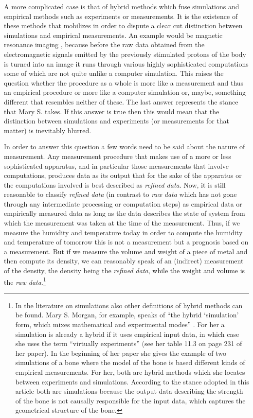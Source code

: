 \documentclass[onecollarge]{STJour}
\numberwithin{equation}{section}
\begin{document}
A more complicated case is that of hybrid methods which fuse simulations and empirical methods such as experiments or measurements. It is the existence of these methods that \citet{morrison:2009} mobilizes in order to dispute a clear cut distinction between simulations and empirical measurements.
An example would be magnetic resonance imaging \citep{lee-carroll:2010}, because before the raw data obtained from the electromagnetic signals emitted by the previously stimulated protons of the body is turned into an image it runs through various highly sophisticated computations some of which are not quite unlike a computer simulation. This raises the question whether the procedure as a whole is more like a measurement and thus an empirical procedure or more like a computer simulation or, maybe, something different that resembles neither of these. The last answer represents the stance that Mary S. \citet{morgan:2003} takes. If this answer is true then this would mean that the distinction between simulations and experiments (or measurements for that matter) is inevitably blurred.

In order to answer this question a few words need to be said about the nature of measurement. Any measurement procedure that makes use of a more or less sophisticated apparatus, and in particular those measurements that involve computations, produces data as its output that for the sake of the apparatus or the computations involved is best described as \emph{refined data}. Now, it is still reasonable to classify \emph{refined data} (in contrast to \emph{raw data} which has not gone through any intermediate processing or computation steps) as empirical data or empirically measured data as long as the data describes the state of system from which the measurement was taken at the time of the measurement. Thus, if we measure the humidity and temperature today in order to compute the humidity and temperature of tomorrow this is not a measurement but a prognosis based on a measurement. But if we measure the volume and weight of a piece of metal and then compute its density, we can reasonably speak of an (indirect) measurement of the density, the density being the \emph{refined data}, while the weight and volume is the \emph{raw data}.\footnote{ \label{FNHybridMorgan} In the literature on simulations also other definitions of  hybrid methods can be found. Mary S. Morgan, for example, speaks of ``the hybrid `simulation' form, which mixes mathematical and experimental modes'' \citep[p. 225]{morgan:2003}. For her a simulation is already a hybrid if it uses empirical input data, in which case she uses the term ``virtually experiments'' (see her table 11.3 on page 231 of her paper). In the beginning of her paper she gives the example of two simulations of a bone where the model of the bone is based different kinds of empirical measurements. For her, both are hybrid methods which she locates between experiments and simulations. According to the stance adopted in this article both are simulations because the output data describing the strength of the bone is not causally responsible for the input data, which captures the geometrical structure of the bone.}
\end{document}
